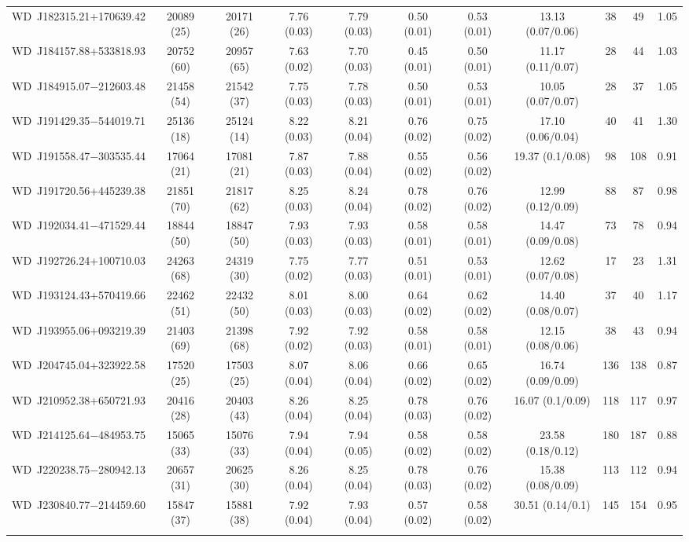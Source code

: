 \documentclass[fleqn,usenatbib, useAMS]{mnras}
\begin{document}
\begin{table*}
\begin{tabular}{ccccccccccc}
WD\	J182315.21+170639.42	&	20089	(25)	&	20171	(26)	&	7.76	(0.03)	&	7.79	(0.03)	&	0.50	(0.01)	&	0.53	(0.01)	&	13.13	(0.07/0.06)	&	38	&	49	&	1.05	\\
WD\	J184157.88+533818.93	&	20752	(60)	&	20957	(65)	&	7.63	(0.02)	&	7.70	(0.03)	&	0.45	(0.01)	&	0.50	(0.01)	&	11.17	(0.11/0.07)	&	28	&	44	&	1.03	\\
WD\	J184915.07$-$212603.48	&	21458	(54)	&	21542	(37)	&	7.75	(0.03)	&	7.78	(0.03)	&	0.50	(0.01)	&	0.53	(0.01)	&	10.05	(0.07/0.07)	&	28	&	37	&	1.05	\\
WD\	J191429.35$-$544019.71	&	25136	(18)	&	25124	(14)	&	8.22	(0.03)	&	8.21	(0.04)	&	0.76	(0.02)	&	0.75	(0.02)	&	17.10	(0.06/0.04)	&	40	&	41	&	1.30	\\
WD\	J191558.47$-$303535.44	&	17064	(21)	&	17081	(21)	&	7.87	(0.03)	&	7.88	(0.04)	&	0.55	(0.02)	&	0.56	(0.02)	&	19.37	(0.1/0.08)	&	98	&	108	&	0.91	\\
WD\	J191720.56+445239.38	&	21851	(70)	&	21817	(62)	&	8.25	(0.03)	&	8.24	(0.04)	&	0.78	(0.02)	&	0.76	(0.02)	&	12.99	(0.12/0.09)	&	88	&	87	&	0.98	\\
WD\	J192034.41$-$471529.44	&	18844	(50)	&	18847	(50)	&	7.93	(0.03)	&	7.93	(0.03)	&	0.58	(0.01)	&	0.58	(0.01)	&	14.47	(0.09/0.08)	&	73	&	78	&	0.94	\\
WD\	J192726.24+100710.03	&	24263	(68)	&	24319	(30)	&	7.75	(0.02)	&	7.77	(0.03)	&	0.51	(0.01)	&	0.53	(0.01)	&	12.62	(0.07/0.08)	&	17	&	23	&	1.31	\\
WD\	J193124.43+570419.66	&	22462	(51)	&	22432	(50)	&	8.01	(0.03)	&	8.00	(0.03)	&	0.64	(0.02)	&	0.62	(0.02)	&	14.40	(0.08/0.07)	&	37	&	40	&	1.17	\\
WD\	J193955.06+093219.39	&	21403	(69)	&	21398	(68)	&	7.92	(0.02)	&	7.92	(0.03)	&	0.58	(0.01)	&	0.58	(0.01)	&	12.15	(0.08/0.06)	&	38	&	43	&	0.94	\\
WD\	J204745.04+323922.58	&	17520	(25)	&	17503	(25)	&	8.07	(0.04)	&	8.06	(0.04)	&	0.66	(0.02)	&	0.65	(0.02)	&	16.74	(0.09/0.09)	&	136	&	138	&	0.87	\\
WD\	J210952.38+650721.93	&	20416	(28)	&	20403	(43)	&	8.26	(0.04)	&	8.25	(0.04)	&	0.78	(0.03)	&	0.76	(0.02)	&	16.07	(0.1/0.09)	&	118	&	117	&	0.97	\\
WD\	J214125.64$-$484953.75	&	15065	(33)	&	15076	(33)	&	7.94	(0.04)	&	7.94	(0.05)	&	0.58	(0.02)	&	0.58	(0.02)	&	23.58	(0.18/0.12)	&	180	&	187	&	0.88	\\
WD\	J220238.75$-$280942.13	&	20657	(31)	&	20625	(30)	&	8.26	(0.04)	&	8.25	(0.04)	&	0.78	(0.03)	&	0.76	(0.02)	&	15.38	(0.08/0.09)	&	113	&	112	&	0.94	\\
WD\	J230840.77$-$214459.60	&	15847	(37)	&	15881	(38)	&	7.92	(0.04)	&	7.93	(0.04)	&	0.57	(0.02)	&	0.58	(0.02)	&	30.51	(0.14/0.1)	&	145	&	154	&	0.95	\\
\hline
\label{tab:phot_params_wd}
\end{tabular}
\end{table*}
\end{document}
